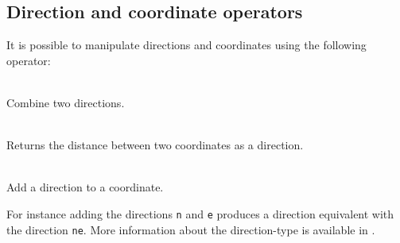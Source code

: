 \subsection{Direction and coordinate operators}

It is possible to manipulate directions and coordinates using the following operator:
\begin{dlist}
  \item {} \\
    Combine two directions.
  \item {} \\
    Returns the distance between two coordinates as a direction.
  \item {} \\
    Add a direction to a coordinate.
\end{dlist}
For instance adding the directions \texttt{n} and \texttt{e} produces a direction
equivalent with the direction \texttt{ne}. More information about the direction-type
is available in .


